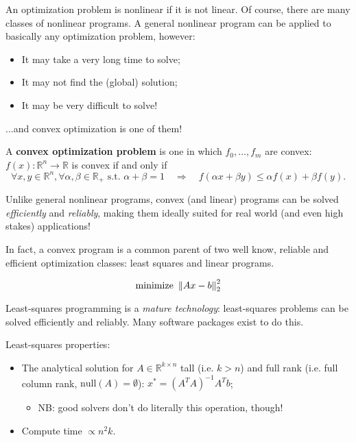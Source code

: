 An optimization problem is nonlinear if it is not linear. Of course, there are many classes of nonlinear programs. A general nonlinear program can be applied to basically any optimization problem, however:

\begin{itemize}
	\item It may take a very long time to solve;
	\item It may not find the (global) solution;
	\item It may be very difficult to solve!
\end{itemize}


...and convex optimization is one of them!

\begin{Definition}
	A \textbf{convex optimization problem} is one in which $f_0,\ldots,f_m$ are convex:
	$f(x):\mathbb R^n\to\mathbb R$ is convex if and only if $$
	\forall x,y\in\mathbb R^n, \forall \alpha,\beta\in\mathbb R_{+}\text{ s.t. }\alpha+\beta=1\quad\Rightarrow\quad f(\alpha x+\beta y)\le \alpha f(x)+\beta f(y).
	$$
\end{Definition}

Unlike general nonlinear programs, convex (and linear) programs can be solved \textit{efficiently} and \textit{reliably}, making them ideally suited for real world (and even high stakes) applications!

In fact, a convex program is a common parent of two well know, reliable and efficient optimization classes: least squares and linear programs.


\begin{Definition}
	\begin{equation*}
		\text{minimize}\,\, \left\|Ax-b\right\|_{2}^2
	\end{equation*}
\end{Definition}

Least-squares programming is a \textit{mature technology}: least-squares problems can be solved efficiently and reliably. Many software packages exist to do this.

\begin{Fact}
	Least-squares properties:
	\begin{itemize}
		\item The analytical solution for $A\in\mathbb R^{k\times n}$ tall (i.e. $k>n$) and full rank (i.e. full column rank, $\text{null}(A)=\emptyset$): $x^*=(A^TA)^{-1}A^Tb$;
		\begin{itemize}
			\item NB: good solvers don't do literally this operation, though!
		\end{itemize}
		\item Compute time $\propto n^2k$.
	\end{itemize}
\end{Fact}

